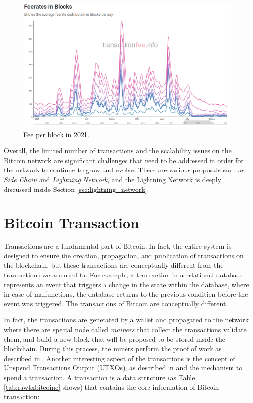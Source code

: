 \begin{figure}
    \begin{center}
      \includegraphics[scale=0.3]{imgs/feerate_blocks.png}
    \end{center}
    \caption{Fee per block in 2021.}
    \label{fig:fee_x_block}
\end{figure}


Overall, the limited number of transactions and the scalability issues on the Bitcoin network
are significant challenges that need to be addressed in order for the network to continue
to grow and evolve. There are various proposals such as \emph{Side Chain} and \emph{Lightning Network}, 
and the Lightning Network is deeply discussed inside Section \ref{sec:lightning_network}.


\section{Bitcoin Transaction}

Transactions are a fundamental part of Bitcoin. In fact, the entire system is designed to ensure
the creation, propagation, and publication of transactions on the blockchain, but these
transactions are conceptually different from the transactions we are used to.
For example, a transaction in a relational database represents an event that triggers a
change in the state within the database, where in case of malfunctions, the database returns
to the previous condition before the event was triggered.
The transactions of Bitcoin are conceptually different.

In fact, the transactions are generated by a wallet and propagated to the network
where there are special node called \emph{mainers} that collect the transactions
validate them, and build a new block that will be proposed to be stored inside 
the blockchain. During this process, the miners perform the proof of work as 
described in \cite{Palazzo_Estrazione_di_Informazioni_2021}.
Another interesting aspect of the transactions is the concept of 
Unspend Transactions Output (UTXOs), as described in \cite{Palazzo_Estrazione_di_Informazioni_2021} 
and the mechanism to spend a transaction.
A transaction is a data structure (as Table \ref{tab:rawtxbitcoinc} shows) that contains the core information
of Bitcoin transaction: 

